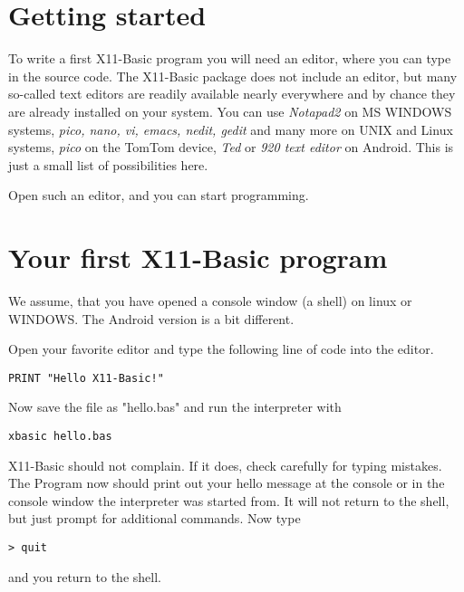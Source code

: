 \section{Getting started}

To write a first X11-Basic program you will need an editor, where you can type
in the source code. The X11-Basic package does not include an editor, but many
so-called text editors are readily available nearly everywhere and by chance
they are already installed on your system. You can use {\it Notapad2} on MS
WINDOWS systems, {\it pico, nano, vi, emacs, nedit, gedit} and many more on
UNIX and Linux systems, {\it pico} on the TomTom device, {\it Ted} or {\it 920
text editor} on Android. This is just a small list of possibilities here. 

Open such an editor, and you can start programming.

\section{Your first X11-Basic program}

We assume, that you have opened a console window (a shell) on linux or WINDOWS. 
The Android version is a bit different. 

Open your favorite editor and type the following line of code into the editor. 

\begin{mdframed}[hidealllines=true,backgroundcolor=blue!20]
\begin{verbatim}
PRINT "Hello X11-Basic!"
\end{verbatim}
\end{mdframed}

Now save the file as "hello.bas" and run the interpreter with 
\begin{mdframed}[hidealllines=true,backgroundcolor=black!20]
\begin{verbatim}
xbasic hello.bas
\end{verbatim}
\end{mdframed}

X11-Basic should not complain. If it does, check carefully for typing mistakes.
The Program now should print out your hello message at the console or in the 
console window the interpreter was started from. It will not return to the 
shell, but just prompt for additional commands. Now type
\begin{mdframed}[hidealllines=true,backgroundcolor=black!20]
\begin{verbatim}
> quit
\end{verbatim}
\end{mdframed}
and you return to the shell. 


